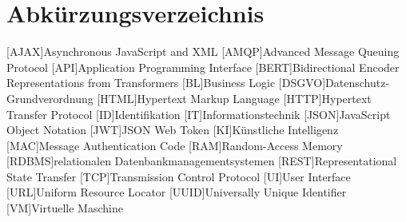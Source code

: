 \section{Abkürzungsverzeichnis}
\begin{acronym}
	[AJAX]{Asynchronous JavaScript and XML}
	[AMQP]{Advanced Message Queuing Protocol}
	[API]{Application Programming Interface}
	[BERT]{Bidirectional Encoder Representations from Transformers}
	[BL]{Business Logic}
	[DSGVO]{Datenschutz-Grundverordnung}
	[HTML]{Hypertext Markup Language}
	[HTTP]{Hypertext Transfer Protocol}
	[ID]{Identifikation}
	[IT]{Informationstechnik}
	[JSON]{JavaScript Object Notation}
	[JWT]{JSON Web Token}
	[KI]{Künstliche Intelligenz}
	[MAC]{Message Authentication Code}
	[RAM]{Random-Access Memory}
	[RDBMS]{relationalen Datenbankmanagementsystemen}
	[REST]{Representational State Transfer}
	[TCP]{Transmission Control Protocol}
	[UI]{User Interface}
	[URL]{Uniform Resource Locator}
	[UUID]{Universally Unique Identifier}
	[VM]{Virtuelle Maschine}
\end{acronym}
